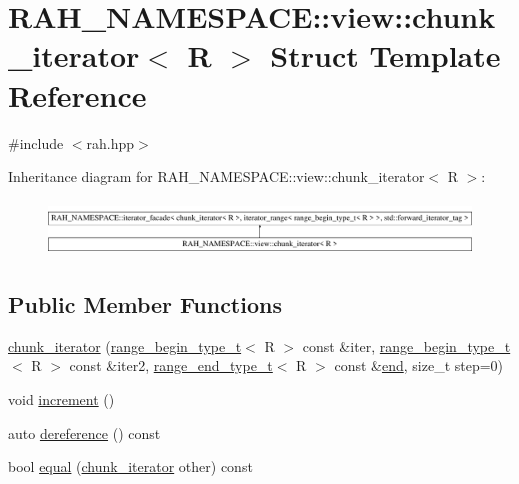 \hypertarget{struct_r_a_h___n_a_m_e_s_p_a_c_e_1_1view_1_1chunk__iterator}{}\section{R\+A\+H\+\_\+\+N\+A\+M\+E\+S\+P\+A\+CE\+::view\+::chunk\+\_\+iterator$<$ R $>$ Struct Template Reference}
\label{struct_r_a_h___n_a_m_e_s_p_a_c_e_1_1view_1_1chunk__iterator}


{\ttfamily \#include $<$rah.\+hpp$>$}

Inheritance diagram for R\+A\+H\+\_\+\+N\+A\+M\+E\+S\+P\+A\+CE\+::view\+::chunk\+\_\+iterator$<$ R $>$\+:\begin{figure}[H]
\begin{center}
\leavevmode
\includegraphics[height=1.465969cm]{struct_r_a_h___n_a_m_e_s_p_a_c_e_1_1view_1_1chunk__iterator}
\end{center}
\end{figure}
\subsection*{Public Member Functions}
\begin{DoxyCompactItemize}
\item 
\mbox{\hyperlink{struct_r_a_h___n_a_m_e_s_p_a_c_e_1_1view_1_1chunk__iterator_a4515e1b164e80b4c2a5bef345a95e11e}{chunk\+\_\+iterator}} (\mbox{\hyperlink{namespace_r_a_h___n_a_m_e_s_p_a_c_e_a46705781d6869d5151141f871ced1e9c}{range\+\_\+begin\+\_\+type\+\_\+t}}$<$ R $>$ const \&iter, \mbox{\hyperlink{namespace_r_a_h___n_a_m_e_s_p_a_c_e_a46705781d6869d5151141f871ced1e9c}{range\+\_\+begin\+\_\+type\+\_\+t}}$<$ R $>$ const \&iter2, \mbox{\hyperlink{namespace_r_a_h___n_a_m_e_s_p_a_c_e_aadeb8c12d454f4cc70bf80766871d3b2}{range\+\_\+end\+\_\+type\+\_\+t}}$<$ R $>$ const \&\mbox{\hyperlink{namespace_r_a_h___n_a_m_e_s_p_a_c_e_ad5f90a809a5221569377c400175a20bf}{end}}, size\+\_\+t step=0)
\item 
void \mbox{\hyperlink{struct_r_a_h___n_a_m_e_s_p_a_c_e_1_1view_1_1chunk__iterator_a2e538a85e6fd5d74014b3c0d86413eca}{increment}} ()
\item 
auto \mbox{\hyperlink{struct_r_a_h___n_a_m_e_s_p_a_c_e_1_1view_1_1chunk__iterator_a01511046d94dad1e8ea6fe1dd6d4a090}{dereference}} () const
\item 
bool \mbox{\hyperlink{struct_r_a_h___n_a_m_e_s_p_a_c_e_1_1view_1_1chunk__iterator_a10cbb936c835b3a554108db4164c7736}{equal}} (\mbox{\hyperlink{struct_r_a_h___n_a_m_e_s_p_a_c_e_1_1view_1_1chunk__iterator}{chunk\+\_\+iterator}} other) const
\end{DoxyCompactItemize}
